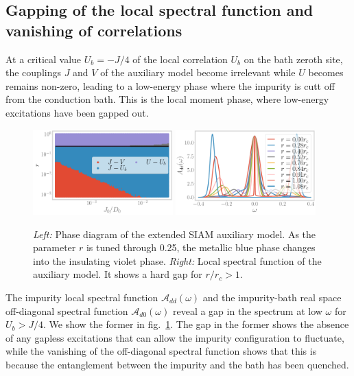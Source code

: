 \documentclass{report}
\numberwithin{equation}{section}
\begin{document}
\subsection{Gapping of the local spectral function and vanishing of correlations}
At a critical value \(U_b = -J/4\) of the local correlation \(U_b\) on the bath zeroth site, the couplings \(J\) and \(V\) of the auxiliary model become irrelevant while \(U\) becomes remains non-zero, leading to a low-energy phase where the impurity is cutt off from the conduction bath. This is the local moment phase, where low-energy excitations have been gapped out.
\begin{figure}[htpb]
	\centering
	\includegraphics[width=0.48\textwidth]{phase-map-MIT.pdf}
	\includegraphics[width=0.48\textwidth]{spectral-function_dd.pdf}
	\caption{{\it Left:} Phase diagram of the extended SIAM auxiliary model. As the parameter \(r\) is tuned through 0.25, the metallic blue phase changes into the insulating violet phase. {\it Right:} Local spectral function of the auxiliary model. It shows a hard gap for \(r/r_c > 1\).}
	\label{spec_func_mit}
\end{figure}

The impurity local spectral function \(\mathcal{A}_{dd}(\omega)\) and the impurity-bath real space off-diagonal spectral function \(\mathcal{A}_{d0}(\omega)\) reveal a gap in the spectrum at low \(\omega\) for \(U_b > J/4\). We show the former in fig.~\ref{spec_func_mit}. The gap in the former shows the absence of any gapless excitations that can allow the impurity configuration to fluctuate, while the vanishing of the off-diagonal spectral function shows that this is because the entanglement between the impurity and the bath has been quenched. 
\end{document}
